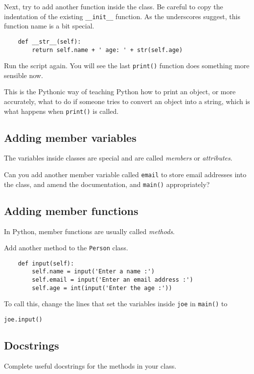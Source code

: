 \documentclass[12pt,oneside]{cttutorial}
\begin{document}
Next, try to add another function inside the class. Be careful to copy the indentation of the existing \lstinline!__init__! function. As the underscores suggest, this function name is a bit special.

\begin{lstlisting}
    def __str__(self):
        return self.name + ' age: ' + str(self.age)
\end{lstlisting}

Run the script again. You will see the last \lstinline!print()! function does something more sensible now.

This is the Pythonic way of teaching Python how to print an object, or more accurately, what to do if someone tries to convert an object into a string, which is what happens when \lstinline!print()! is called.

\subsection{Adding member variables}

The variables inside classes are special and are called \emph{members} or \emph{attributes}.

Can you add another member variable called \lstinline!email! to store email addresses into the class, and amend the documentation, and \lstinline!main()! appropriately?

\subsection{Adding member functions}

In Python, member functions are usually called \emph{methods}.

Add another method to the \lstinline!Person! class.

\begin{lstlisting}
    def input(self):
        self.name = input('Enter a name :')
        self.email = input('Enter an email address :')
        self.age = int(input('Enter the age :'))
\end{lstlisting}

To call this, change the lines that set the variables inside \lstinline!joe! in \lstinline!main()! to

\begin{lstlisting}
joe.input()
\end{lstlisting}

\subsection{Docstrings}
Complete useful docstrings for the methods in your class.
\end{document}
